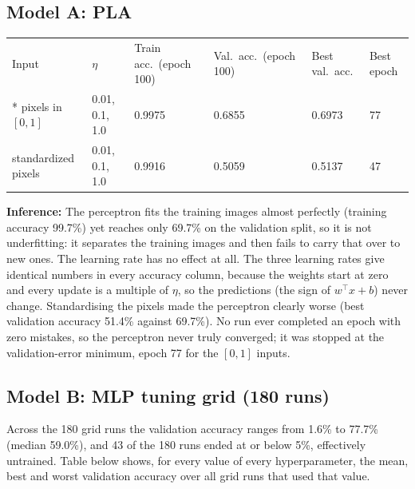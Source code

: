 \documentclass[12pt,a4paper]{article}
\begin{document}
\subsection*{Model A: PLA}
{\small\setlength{\tabcolsep}{4pt}
\begin{longtable}{p{3.3cm}p{2.3cm}p{2.2cm}p{2.2cm}p{2.0cm}p{1.6cm}}
\toprule
Input & $\eta$ & Train acc.\ (epoch 100) & Val.\ acc.\ (epoch 100) & Best val.\ acc. & Best epoch \\*
\midrule
pixels in $[0,1]$ & 0.01, 0.1, 1.0 & 0.9975 & 0.6855 & 0.6973 & 77 \\
standardized pixels & 0.01, 0.1, 1.0 & 0.9916 & 0.5059 & 0.5137 & 47 \\
\bottomrule
\end{longtable}
}

\textbf{Inference:} The perceptron fits the training images almost perfectly (training accuracy
99.7\%) yet reaches only
69.7\% on the validation split, so it is not
underfitting: it separates the training images and then fails to carry that over to new ones.
The learning rate has no effect at all. The three learning rates give identical numbers in every
accuracy column, because the weights start at zero and every update is a multiple of $\eta$, so the
predictions (the sign of $w^{\top}x + b$) never change. Standardising the pixels made the
perceptron clearly worse (best validation accuracy 51.4\%
against 69.7\%). No run ever completed an epoch with zero
mistakes, so the perceptron never truly converged; it was stopped at the validation-error minimum,
epoch 77 for the $[0,1]$ inputs.

\subsection*{Model B: MLP tuning grid (180 runs)}
Across the 180 grid runs the validation accuracy ranges from 1.6\% to 77.7\%
(median 59.0\%), and 43 of the 180 runs ended at or below 5\%, effectively
untrained. Table below shows, for every value of every hyperparameter, the mean, best and worst
validation accuracy over all grid runs that used that value.
\end{document}
